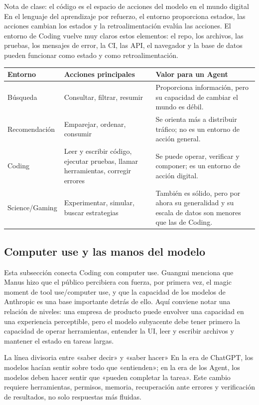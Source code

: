 \begin{knowledgebox}{Nota de clase: el código es el espacio de acciones del modelo en el mundo digital}
En el lenguaje del aprendizaje por refuerzo, el entorno proporciona estados, las acciones cambian los estados y la retroalimentación evalúa las acciones. El entorno de Coding vuelve muy claros estos elementos: el repo, los archivos, las pruebas, los mensajes de error, la CI, las API, el navegador y la base de datos pueden funcionar como estado y como retroalimentación.
\end{knowledgebox}

\noindent\begin{tabularx}{\textwidth}{p{}p{}X}
\toprule
Entorno & Acciones principales & Valor para un Agent \\
\midrule
Búsqueda & Consultar, filtrar, resumir & Proporciona información, pero su capacidad de cambiar el mundo es débil. \\
Recomendación & Emparejar, ordenar, consumir & Se orienta más a distribuir tráfico; no es un entorno de acción general. \\
Coding & Leer y escribir código, ejecutar pruebas, llamar herramientas, corregir errores & Se puede operar, verificar y componer; es un entorno de acción digital. \\
Science/Gaming & Experimentar, simular, buscar estrategias & También es sólido, pero por ahora su generalidad y su escala de datos son menores que las de Coding. \\
\bottomrule
\end{tabularx}

\subsection{Computer use y las manos del modelo}

Esta subsección conecta Coding con computer use. Guangmi menciona que Manus hizo que el público percibiera con fuerza, por primera vez, el magic moment de tool use/computer use, y que la capacidad de los modelos de Anthropic es una base importante detrás de ello. Aquí conviene notar una relación de niveles: una empresa de producto puede envolver una capacidad en una experiencia perceptible, pero el modelo subyacente debe tener primero la capacidad de operar herramientas, entender la UI, leer y escribir archivos y mantener el estado en tareas largas.

\begin{importantbox}{La línea divisoria entre «saber decir» y «saber hacer»}
En la era de ChatGPT, los modelos hacían sentir sobre todo que «entienden»; en la era de los Agent, los modelos deben hacer sentir que «pueden completar la tarea». Este cambio requiere herramientas, permisos, memoria, recuperación ante errores y verificación de resultados, no solo respuestas más fluidas.
\end{importantbox}

